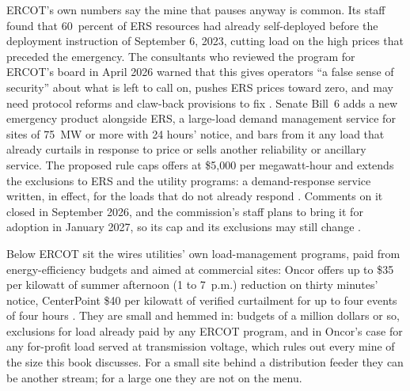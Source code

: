 ERCOT's own numbers say the mine that pauses anyway is common. Its staff found that 60~percent of ERS resources had already self-deployed before the deployment instruction of September 6, 2023, cutting load on the high prices that preceded the emergency. The consultants who reviewed the program for ERCOT's board in April 2026 warned that this gives operators ``a false sense of security'' about what is left to call on, pushes ERS prices toward zero, and may need protocol reforms and claw-back provisions to fix \autocite{ercotboard2026dr,ercotgridinsightsdr2025}. %
Senate Bill~6 adds a new emergency product alongside ERS, a large-load demand management service for sites of 75~MW or more with 24 hours' notice, and bars from it any load that already curtails in response to price or sells another reliability or ancillary service. The proposed rule caps offers at \$5,000 per megawatt-hour and extends the exclusions to ERS and the utility programs: a demand-response service written, in effect, for the loads that do not already respond \autocite{texas2025sb6,puct2026prop58482}. %
Comments on it closed in September 2026, and the commission's staff plans to bring it for adoption in January 2027, so its cap and its exclusions may still change \autocite{puct2026sb6roadmap}. %

Below ERCOT sit the wires utilities' own load-management programs, paid from energy-efficiency budgets and aimed at commercial sites: Oncor offers up to \$35 per kilowatt of summer afternoon (1 to 7~p.m.) reduction on thirty minutes' notice, CenterPoint \$40 per kilowatt of verified curtailment for up to four events of four hours \autocite{oncor2026clmsop,centerpoint2025clm}. %
They are small and hemmed in: budgets of a million dollars or so, exclusions for load already paid by any ERCOT program, and in Oncor's case for any for-profit load served at transmission voltage, which rules out every mine of the size this book discusses. %
For a small site behind a distribution feeder they can be another stream; for a large one they are not on the menu.

